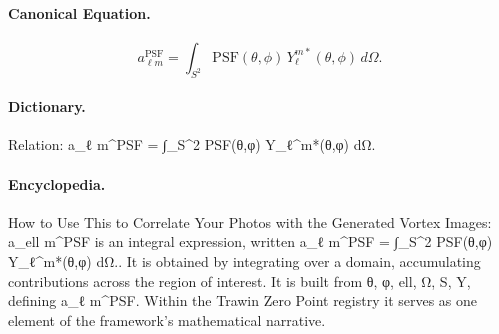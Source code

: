 \paragraph{Canonical Equation.}
\[
a_{\ell m}^{\text{PSF}} = \int_{S^2} \text{PSF}(\theta,\phi)\, Y_\ell^{m*}(\theta,\phi)\, d\Omega.
\]

\paragraph{Dictionary.}
Relation: a\_ℓ m\textasciicircum{}PSF = ∫\_S\textasciicircum{}2 PSF(θ,φ) Y\_ℓ\textasciicircum{}m*(θ,φ) dΩ.

\paragraph{Encyclopedia.}
How to Use This to Correlate Your Photos with the Generated Vortex Images: a\_ell m\textasciicircum{}PSF is an integral expression, written a\_ℓ m\textasciicircum{}PSF = ∫\_S\textasciicircum{}2 PSF(θ,φ) Y\_ℓ\textasciicircum{}m*(θ,φ) dΩ.. It is obtained by integrating over a domain, accumulating contributions across the region of interest. It is built from θ, φ, ell, Ω, S, Y, defining a\_ℓ m\textasciicircum{}PSF. Within the Trawin Zero Point registry it serves as one element of the framework's mathematical narrative.
